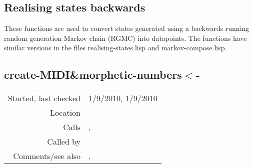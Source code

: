 \subsection{Realising states backwards}\label{sec:realising-states-backwards}

These functions are used to convert states generated
using a backwards running random generation Markov
chain (RGMC) into datapoints. The functions have
similar versions in the files realising-states.lisp
and markov-compose.lisp.


\subsection*{create-MIDI\&morphetic-numbers$<$-}\label{fun:create-MIDI-and-morphetic-numbers<-}

\vspace{0.3cm}
\begin{tabular}{r|p{8cm}}
Started, last checked & 1/9/2010, 1/9/2010 \\
Location & \nameref{sec:realising-states-backwards} \\
Calls & \nameref{fun:add-to-list}, \nameref{fun:nth-list-of-lists} \\
Called by & \nameref{fun:states2datapoints-by-lookup<-} \\
Comments/see also & \nameref{fun:create-MIDI-and-morphetic-numbers},\newline \nameref{fun:create-MIDI-note-numbers}
\end{tabular}

